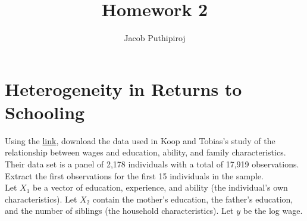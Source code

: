 \documentclass{article}
\begin{document}
\title{\vspace{-2.0cm}Homework 2}
\author{Jacob Puthipiroj}
\maketitle


\section{Heterogeneity in Returns to Schooling}


Using the \href{http://people.stern.nyu.edu/wgreene/Econometrics/PanelDataSets.htm}{link}, download the data used in Koop and Tobias's \cite{koop2004learning} study of the relationship between wages and education, ability, and family characteristics. Their data set is a panel of 2,178 individuals with a total of 17,919 observations. Extract the first observations for the first 15 individuals in the sample.\\


Let $X_1$ be a vector of education, experience, and ability (the individual's own characteristics). Let $X_2$ contain the mother's education, the father's education, and the number of siblings (the household characteristics). Let $y$ be the log wage.
\end{document}

